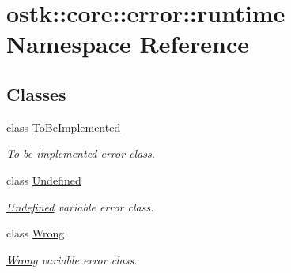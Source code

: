 \hypertarget{namespaceostk_1_1core_1_1error_1_1runtime}{}\section{ostk\+:\+:core\+:\+:error\+:\+:runtime Namespace Reference}
\label{namespaceostk_1_1core_1_1error_1_1runtime}
\subsection*{Classes}
\begin{DoxyCompactItemize}
\item 
class \hyperlink{classostk_1_1core_1_1error_1_1runtime_1_1_to_be_implemented}{To\+Be\+Implemented}
\begin{DoxyCompactList}\small\item\em To be implemented error class. \end{DoxyCompactList}\item 
class \hyperlink{classostk_1_1core_1_1error_1_1runtime_1_1_undefined}{Undefined}
\begin{DoxyCompactList}\small\item\em \hyperlink{classostk_1_1core_1_1error_1_1runtime_1_1_undefined}{Undefined} variable error class. \end{DoxyCompactList}\item 
class \hyperlink{classostk_1_1core_1_1error_1_1runtime_1_1_wrong}{Wrong}
\begin{DoxyCompactList}\small\item\em \hyperlink{classostk_1_1core_1_1error_1_1runtime_1_1_wrong}{Wrong} variable error class. \end{DoxyCompactList}\end{DoxyCompactItemize}
